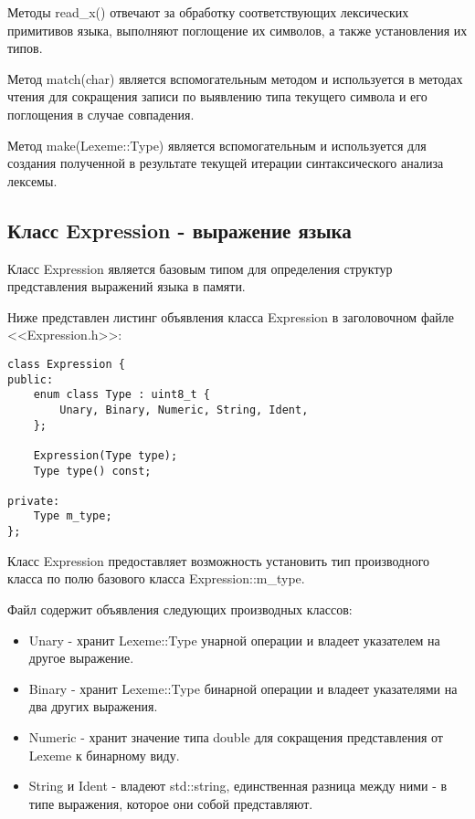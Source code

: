 Методы read\_x() отвечают за обработку соответствующих 
лексических примитивов языка, выполняют поглощение их 
символов, а также установления их типов.

Метод match(char) является вспомогательным методом
и используется в методах чтения для сокращения
записи по выявлению типа текущего символа и его поглощения
в случае совпадения.

Метод make(Lexeme::Type) является вспомогательным
и используется для создания
полученной в результате текущей итерации
синтаксического анализа лексемы.

\subsection{Класс Expression - выражение языка}

Класс Expression является базовым типом для определения
структур представления выражений языка в памяти.

Ниже представлен листинг объявления класса Expression
в заголовочном файле <<Expression.h>>:

\begin{verbatim}
class Expression {
public:
    enum class Type : uint8_t {
        Unary, Binary, Numeric, String, Ident,
    };

    Expression(Type type);
    Type type() const;

private:
    Type m_type;
};
\end{verbatim}

Класс Expression предоставляет возможность установить
тип производного класса по полю базового класса
Expression::m\_type.

Файл содержит объявления следующих производных классов:
\begin{itemize}
    \item Unary - хранит Lexeme::Type унарной операции
          и владеет указателем на другое выражение.

    \item Binary - хранит Lexeme::Type бинарной операции
          и владеет указателями на два других выражения.

    \item Numeric - хранит значение типа double для
          сокращения представления от Lexeme к бинарному
          виду.
          
    \item String и Ident - владеют std::string,
          единственная разница между ними - в типе
          выражения, которое они собой представляют.
\end{itemize}

